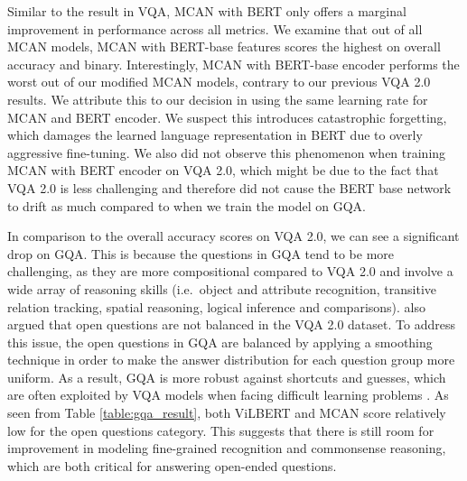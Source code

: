 \documentclass{article}
\begin{document}
Similar to the result in VQA, MCAN with BERT only offers a marginal improvement in performance across all metrics. We examine that out of all MCAN models, MCAN with BERT-base features scores the highest on overall accuracy and binary. Interestingly, MCAN with BERT-base encoder performs the worst out of our modified MCAN models, contrary to our previous VQA 2.0 results. We attribute this to our decision in using the same learning rate for MCAN and BERT encoder. We suspect this introduces catastrophic forgetting, which damages the learned language representation in BERT due to overly aggressive fine-tuning. We also did not observe this phenomenon when training MCAN with BERT encoder on VQA 2.0, which might be due to the fact that VQA 2.0 is less challenging and therefore did not cause the BERT base network to drift as much compared to when we train the model on GQA.


In comparison to the overall accuracy scores on VQA 2.0, we can see a significant drop on GQA. This is because the questions in GQA tend to be more challenging, as they are more compositional compared to VQA 2.0 and involve a wide array of reasoning skills (i.e.\, object and attribute recognition, transitive relation tracking, spatial reasoning, logical inference and comparisons). \citet{hudson2019gqa} also argued that open questions are not balanced in the VQA 2.0 dataset. To address this issue, the open questions in GQA are balanced by applying a smoothing technique in order to make the answer distribution for each question group more uniform. As a result, GQA is more robust against shortcuts and guesses, which are often exploited by VQA models when facing difficult learning problems \citep{agrawal12018gvqa}. As seen from Table \ref{table:gqa_result}, both ViLBERT and MCAN score relatively low for the open questions category. This suggests that there is still room for improvement in modeling fine-grained recognition and commonsense reasoning, which are both critical for answering open-ended questions.

\end{document}
